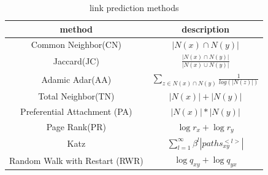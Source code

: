 \documentclass[12pt]{article}
\begin{document}
\begin{table}
	\begin{center}
		\begin{tabular}{|c|c|}
			\hline
			method & description \\
			\hline
			Common Neighbor(CN) & $|N(x) \cap N(y)|$ \\
			Jaccard(JC) & $\frac{|N(x) \cap N(y)|}{|N(x) \cup N(y)|}$ \\
			Adamic Adar(AA) & $\sum_{z \in N(x) \cap N(y)}{\frac{1}{log(|N(z)|)}}$ \\
			Total Neighbor(TN) & $|N(x)| + |N(y)|$ \\
			Preferential Attachment (PA) & $|N(x)| * |N(y)|$ \\
			Page Rank(PR)  & $\log{r_x} + \log{r_y}$ \\
			Katz & $\sum_{l=1}^{\infty}\beta^l|paths_{xy}^{<l>}|$\\
			Random Walk with Restart (RWR)& $\log {q_{xy}} + \log {q_{yx}}$\\
			\hline
		\end{tabular}
	\end{center}
	\caption{link prediction methods}
	\label{tab:method}
\end{table}
\end{document}
